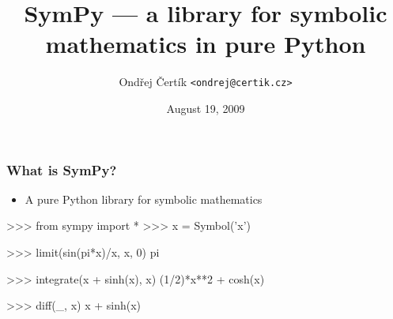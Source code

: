 \documentclass{beamer}
\title{SymPy --- a library for symbolic mathematics \linebreak in pure Python}
\author{Ondřej Čertík \texttt{<ondrej@certik.cz>}}
\institute[PWR]{University of Nevada, Reno\linebreak SymPy Development Team}
\date{August 19, 2009}
\begin{document}

\frame{\titlepage}

\begin{frame}[fragile]
    \frametitle{What is SymPy?}

    \begin{itemize}
        \item A pure Python library for symbolic mathematics
    \end{itemize}

    \begin{python}
  >>> from sympy import *
  >>> x = Symbol('x')

  >>> limit(sin(pi*x)/x, x, 0)
  pi

  >>> integrate(x + sinh(x), x)
  (1/2)*x**2 + cosh(x)

  >>> diff(_, x)
  x + sinh(x)
    \end{python}
\end{frame}
\end{document}
